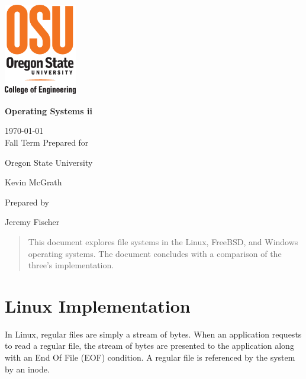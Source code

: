 \documentclass[onecolumn,draftclsnofoot, 10pt, compsoc]{IEEEtran}
\def \GroupNumber{		17}
\def \Jeremy{			Jeremy Fischer}
\def \Class{		Operating Systems ii}
\def \School{	Oregon State University}
\def \Professor{		 Kevin McGrath}
\begin{document}
\begin{titlepage}
    \begin{singlespace}
    \includegraphics[height=4cm]{coe.eps}
        \hfill  
        \par\vspace{.2in}
        \centering
        \scshape{
            \vspace{.5in}
            \textbf{\Huge\Class}\par
            \large{
            	\today \\Fall Term
        	}
            \vfill
            {\large Prepared for}\par
            \huge \School\par
            \vspace{5pt}
            {\Large{\Professor}\par}
            {\large Prepared by }\par
            \vspace{5pt}
            {\Large
                {\Jeremy}\par
            }
            \vspace{20pt}
        }
        \begin{abstract}
        	This document explores file systems in the Linux, FreeBSD, and Windows operating systems. 
        	The document concludes with a comparison of the three's implementation.
        \end{abstract}     
    \end{singlespace}
\end{titlepage}
\newpage
{}
\tableofcontents
\clearpage









\section{Linux Implementation}
	In Linux, regular files are simply a stream of bytes.
	When an application requests to read a regular file, the stream of bytes are presented to the application along with an End Of File (EOF) condition.
	A regular file is referenced by the system by an inode.
	
\end{document}

